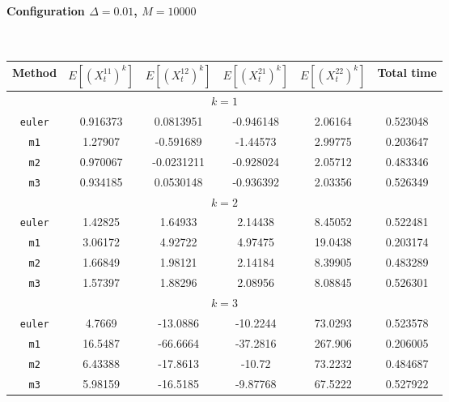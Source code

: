 \paragraph*{Configuration $\Delta=0.01$, $M=10000$}\hfill\\
\begin{tabular}{@{}*{6}{c}@{}}
Method & $E[(X^{11}_t)^k]$ & $E[(X^{12}_t)^k]$ & $E[(X^{21}_t)^k]$ & $E[(X^{22}_t)^k]$ & Total time\\
\hline
\multicolumn{6}{c}{$k=1$}\\
\verb+euler+ & 0.916373 & 0.0813951 & -0.946148 & 2.06164 & 0.523048 \\
 \verb+m1+ & 1.27907 & -0.591689 & -1.44573 & 2.99775 & 0.203647 \\
 \verb+m2+ & 0.970067 & -0.0231211 & -0.928024 & 2.05712 & 0.483346 \\
 \verb+m3+ & 0.934185 & 0.0530148 & -0.936392 & 2.03356 & 0.526349 \\
\hline
\multicolumn{6}{c}{$k=2$}\\
\verb+euler+ & 1.42825 & 1.64933 & 2.14438 & 8.45052 & 0.522481 \\
 \verb+m1+ & 3.06172 & 4.92722 & 4.97475 & 19.0438 & 0.203174 \\
 \verb+m2+ & 1.66849 & 1.98121 & 2.14184 & 8.39905 & 0.483289 \\
 \verb+m3+ & 1.57397 & 1.88296 & 2.08956 & 8.08845 & 0.526301 \\
\hline
\multicolumn{6}{c}{$k=3$}\\
\verb+euler+ & 4.7669 & -13.0886 & -10.2244 & 73.0293 & 0.523578 \\
 \verb+m1+ & 16.5487 & -66.6664 & -37.2816 & 267.906 & 0.206005 \\
 \verb+m2+ & 6.43388 & -17.8613 & -10.72 & 73.2232 & 0.484687 \\
 \verb+m3+ & 5.98159 & -16.5185 & -9.87768 & 67.5222 & 0.527922 
\end{tabular}\hfill\\
